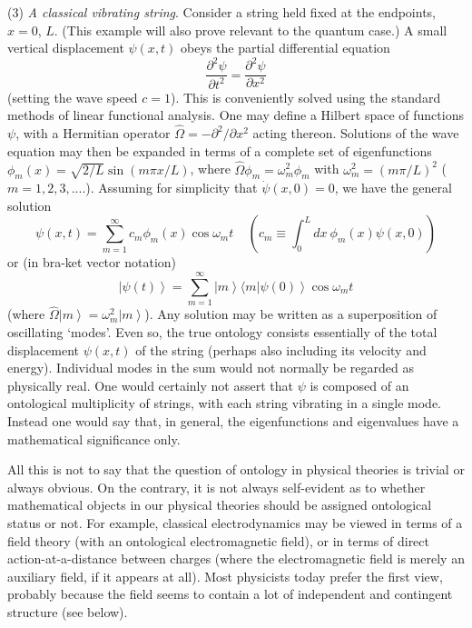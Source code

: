 \documentclass[12pt]{article}%
\begin{document}
(3) \textit{A classical vibrating string}. Consider a string held fixed at the
endpoints, $x=0$, $L$. (This example will also prove relevant to the quantum
case.) A small vertical displacement $\psi(x,t)$ obeys the partial
differential equation%
\[
\frac{\partial^{2}\psi}{\partial t^{2}}=\frac{\partial^{2}\psi}{\partial
x^{2}}%
\]
(setting the wave speed $c=1$). This is conveniently solved using the standard
methods of linear functional analysis. One may define a Hilbert space of
functions $\psi$, with a Hermitian operator $\hat{\Omega}=-\partial
^{2}/\partial x^{2}$ acting thereon. Solutions of the wave equation may then
be expanded in terms of a complete set of eigenfunctions $\phi_{m}%
(x)=\sqrt{2/L}\sin\left(  m\pi x/L\right)  $, where $\hat{\Omega}\phi
_{m}=\omega_{m}^{2}\phi_{m}$ with $\omega_{m}^{2}=\left(  m\pi/L\right)  ^{2}$
($m=1,2,3,....$). Assuming for simplicity that $\dot{\psi}(x,0)=0$, we have
the general solution%
\[
\psi(x,t)=\sum_{m=1}^{\infty}c_{m}\phi_{m}(x)\cos\omega_{m}t\ \ \ \ \ \left(
c_{m}\equiv\int_{0}^{L}dx\ \phi_{m}(x)\psi(x,0)\right)
\]
or (in bra-ket vector notation)%
\[
\left\vert \psi(t)\right\rangle =\sum_{m=1}^{\infty}\left\vert m\right\rangle
\langle m\left\vert \psi(0)\right\rangle \cos\omega_{m}t
\]
(where $\hat{\Omega}\left\vert m\right\rangle =\omega_{m}^{2}\left\vert
m\right\rangle $). Any solution may be written as a superposition of
oscillating `modes'. Even so, the true ontology consists essentially of the
total displacement $\psi(x,t)$ of the string (perhaps also including its
velocity and energy). Individual modes in the sum would not normally be
regarded as physically real. One would certainly not assert that $\psi$ is
composed of an ontological multiplicity of strings, with each string vibrating
in a single mode. Instead one would say that, in general, the eigenfunctions
and eigenvalues have a mathematical significance only.

All this is not to say that the question of ontology in physical theories is
trivial or always obvious. On the contrary, it is not always self-evident as
to whether mathematical objects in our physical theories should be assigned
ontological status or not. For example, classical electrodynamics may be
viewed in terms of a field theory (with an ontological electromagnetic field),
or in terms of direct action-at-a-distance between charges (where the
electromagnetic field is merely an auxiliary field, if it appears at all).
Most physicists today prefer the first view, probably because the field seems
to contain a lot of independent and contingent structure (see below).
\end{document}
